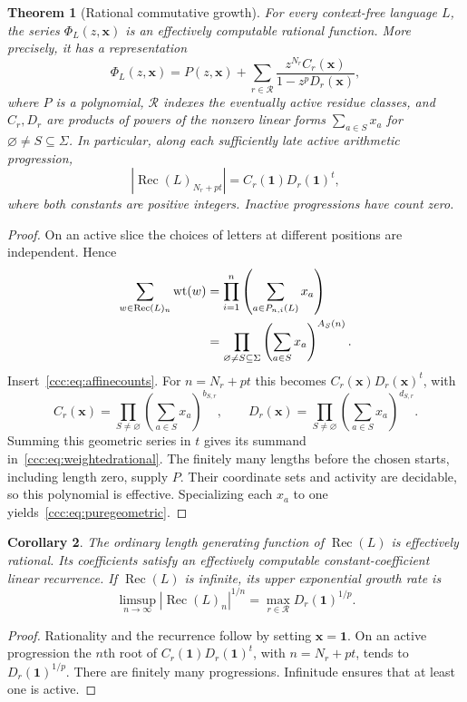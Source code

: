 \documentclass[11pt,letterpaper]{article}
\newtheorem{theorem}{Theorem}[section]
\newtheorem{corollary}[theorem]{Corollary}
\theoremstyle{definition}
\theoremstyle{remark}
\newcommand{\rec}{\operatorname{Rec}}
\begin{document}
\begin{theorem}[Rational commutative growth]\label{ccc:thm:rational}
For every context-free language $L$, the series $\Phi_L(z,\mathbf x)$ is an
effectively computable rational function. More precisely, it has a
representation
\begin{equation}
 \Phi_L(z,\mathbf x)=P(z,\mathbf x)
   +\sum_{r\in\mathcal R}
       \frac{z^{N_r}C_r(\mathbf x)}{1-z^p D_r(\mathbf x)},
 \label{ccc:eq:weightedrational}
\end{equation}
where $P$ is a polynomial, $\mathcal R$ indexes the eventually active
residue classes, and $C_r,D_r$ are products of powers of the nonzero linear
forms $\sum_{a\in S}x_a$ for $\varnothing\ne S\subseteq\Sigma$.
In particular, along each sufficiently late active arithmetic progression,
\begin{equation}
 |\rec(L)_{N_r+pt}|=C_r(\mathbf1)D_r(\mathbf1)^t,
 \label{ccc:eq:puregeometric}
\end{equation}
where both constants are positive integers. Inactive progressions have count
zero.
\end{theorem}
\begin{proof}
On an active slice the choices of letters at different positions are
independent. Hence
\begin{align}
 \sum_{w\in\rec(L)_n}\operatorname{wt}(w)
 &=\prod_{i=1}^{n}\left(\sum_{a\in P_{n,i}(L)}x_a\right)\notag\\
 &=\prod_{\varnothing\ne S\subseteq\Sigma}
      \left(\sum_{a\in S}x_a\right)^{A_S(n)}.
 \label{ccc:eq:positionproduct}
\end{align}
Insert~\eqref{ccc:eq:affinecounts}. For $n=N_r+pt$ this becomes
$C_r(\mathbf x)D_r(\mathbf x)^t$, with
\[
 C_r(\mathbf x)=\prod_{S\ne\varnothing}
       \left(\sum_{a\in S}x_a\right)^{b_{S,r}},\qquad
 D_r(\mathbf x)=\prod_{S\ne\varnothing}
       \left(\sum_{a\in S}x_a\right)^{d_{S,r}}.
\]
Summing this geometric series in $t$ gives its summand
in~\eqref{ccc:eq:weightedrational}. The finitely many lengths before the chosen
starts, including length zero, supply $P$. Their coordinate sets and activity
are decidable, so this polynomial is effective. Specializing each $x_a$ to
one yields~\eqref{ccc:eq:puregeometric}.
\end{proof}

\begin{corollary}\label{ccc:cor:growthrate}
The ordinary length generating function of $\rec(L)$ is effectively rational.
Its coefficients satisfy an effectively computable constant-coefficient
linear recurrence. If $\rec(L)$ is infinite, its upper exponential growth
rate is
\[
 \limsup_{n\to\infty}|\rec(L)_n|^{1/n}
   =\max_{r\in\mathcal R} D_r(\mathbf1)^{1/p}.
\]
\end{corollary}
\begin{proof}
Rationality and the recurrence follow by setting $\mathbf x=\mathbf1$.
On an active progression the $n$th root of
$C_r(\mathbf1)D_r(\mathbf1)^t$, with $n=N_r+pt$, tends to
$D_r(\mathbf1)^{1/p}$. There are finitely many progressions. Infinitude
ensures that at least one is active.
\end{proof}
\end{document}
